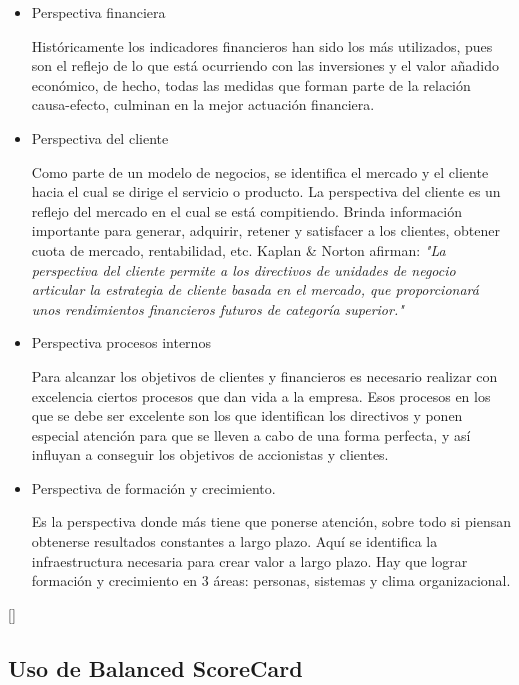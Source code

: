 \documentclass[10pt,a4paper]{article}
\begin{document}
			\begin{itemize}
				\item Perspectiva financiera
				
				Históricamente los indicadores financieros han sido los más utilizados, pues son el reflejo de lo que está ocurriendo con las inversiones y el valor añadido económico, de hecho, todas las medidas que forman parte de la relación causa-efecto, culminan en la mejor actuación financiera.
				
				\item Perspectiva del cliente
				
				Como parte de un modelo de negocios, se identifica el mercado y el cliente hacia el cual se dirige el servicio o producto. La perspectiva del cliente es un reflejo del mercado en el cual se está compitiendo. Brinda información importante para generar, adquirir, retener y satisfacer a los clientes, obtener cuota de mercado, rentabilidad, etc. Kaplan \& Norton afirman: \textit{"La perspectiva del cliente permite a los directivos de unidades de negocio articular la estrategia de cliente basada en el mercado, que proporcionará unos rendimientos financieros futuros de categoría superior."} 
				 
				\item Perspectiva procesos internos
				
				Para alcanzar los objetivos de clientes y financieros es necesario realizar con excelencia ciertos procesos que dan vida a la empresa. Esos procesos en los que se debe ser excelente son los que identifican los directivos y ponen especial atención para que se lleven a cabo de una forma perfecta, y así influyan a conseguir los objetivos de accionistas y clientes.
				
				\item Perspectiva de formación y crecimiento.
				
				Es la perspectiva donde más tiene que ponerse atención, sobre todo si piensan obtenerse resultados constantes a largo plazo. Aquí se identifica la infraestructura necesaria para crear valor a largo plazo. Hay que lograr formación y crecimiento en 3 áreas: personas, sistemas y clima organizacional. 
				
			\end{itemize}
			[\cite{osterwalder2014canvas}]
		
			\subsection{Uso de Balanced ScoreCard}
			
\end{document}
